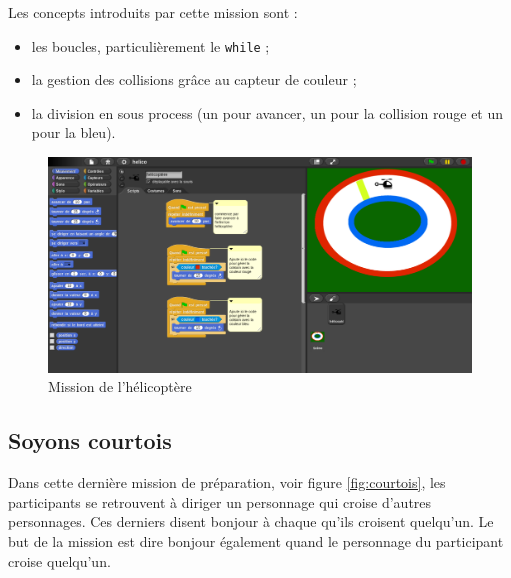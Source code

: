 Les concepts introduits par cette mission sont :
\begin{itemize}
\item les boucles, particulièrement le \texttt{while} ;
\item la gestion des collisions grâce au capteur de couleur ;
\item la division en sous process (un pour avancer, un pour la collision rouge et un pour la bleu).
\end{itemize}
\begin{figure}[ht]
  \begin{center}
    \includegraphics[scale=0.3]{content/7-solution/1-missions/images/helicoptere}
    \caption{Mission de l'hélicoptère}
    \label{fig:mission-hélicoptère}
  \end{center}
\end{figure}

\subsection{Soyons courtois}
\label{mission-courtois}
Dans cette dernière mission de préparation, voir figure \ref{fig:courtois}, les participants se retrouvent à diriger un personnage qui croise d'autres personnages. Ces derniers disent bonjour à chaque qu'ils croisent quelqu'un. Le but de la mission est dire bonjour également quand le personnage du participant croise quelqu'un.

